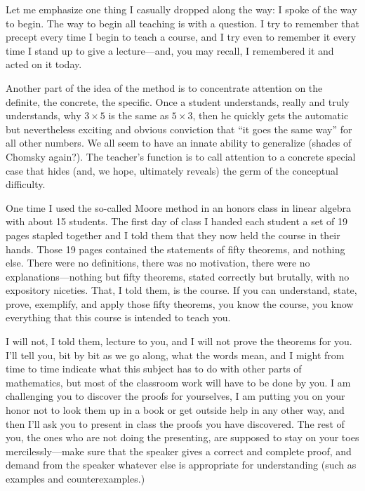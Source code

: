 \documentclass[a4paper,12pt]{article}
\begin{document}
Let me emphasize one thing I casually dropped along the way: I spoke of
the way to begin.  The way to begin all teaching is with a question.  I
try to remember that precept every time I begin to teach a course, and I
try even to remember it every time I stand up to give a lecture—and, you
may recall, I remembered it and acted on it today.

Another part of the idea of the method is to concentrate attention on the
definite, the concrete, the specific.  Once a student understands, really
and truly understands, why \(3 \times 5\) is the same as \(5 \times 3\),
then he quickly gets the automatic but nevertheless exciting and obvious
conviction that “it goes the same way” for all other numbers.  We all seem
to have an innate ability to generalize (shades of Chomsky again?).  The
teacher’s function is to call attention to a concrete special case that
hides (and, we hope, ultimately reveals) the germ of the conceptual
difficulty.

One time I used the so-called Moore method in an honors class in linear
algebra with about 15 students.  The first day of class I handed each
student a set of 19 pages stapled together and I told them that they now
held the course in their hands.  Those 19 pages contained the statements
of fifty theorems, and nothing else.  There were no definitions, there was
no motivation, there were no explanations—nothing but fifty theorems,
stated correctly but brutally, with no expository niceties.  That, I told
them, is the course.  If you can understand, state, prove, exemplify, and
apply those fifty theorems, you know the course, you know everything that
this course is intended to teach you.

I will not, I told them, lecture to you, and I will not prove the theorems
for you.  I’ll tell you, bit by bit as we go along, what the words mean,
and I might from time to time indicate what this subject has to do with
other parts of mathematics, but most of the classroom work will have to be
done by you.  I am challenging you to discover the proofs for yourselves, I
am putting you on your honor not to look them up in a book or get outside
help in any other way, and then I’ll ask you to present in class the
proofs you have discovered.  The rest of you, the ones who are not doing
the presenting, are supposed to stay on your toes mercilessly—make sure
that the speaker gives a correct and complete proof, and demand from the
speaker whatever else is appropriate for understanding (such as examples
and counterexamples.)
\end{document}
